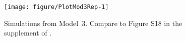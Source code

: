 \begin{figure}[!h]
\begin{knitrout}
\color{fgcolor}

{\centering \texttt{[image: figure/PlotMod3Rep-1]} 

}


\end{knitrout}
\caption{\label{fig:mod3rep}
Simulations from Model~3.
Compare to Figure S18 in the supplement of \cite{lee20}.
}
\end{figure}



